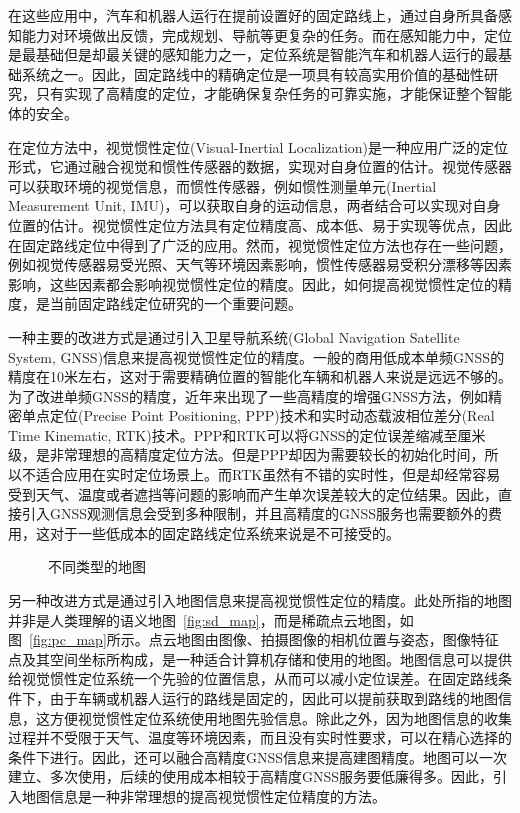 在这些应用中，汽车和机器人运行在提前设置好的固定路线上，通过自身所具备感知能力对环境做出反馈，完成规划、导航等更复杂的任务。而在感知能力中，定位是最基础但是却最关键的感知能力之一，定位系统是智能汽车和机器人运行的最基础系统之一。因此，固定路线中的精确定位是一项具有较高实用价值的基础性研究，只有实现了高精度的定位，才能确保复杂任务的可靠实施，才能保证整个智能体的安全。

在定位方法中，视觉惯性定位(Visual-Inertial Localization)是一种应用广泛的定位形式，它通过融合视觉和惯性传感器的数据，实现对自身位置的估计。视觉传感器可以获取环境的视觉信息，而惯性传感器，例如惯性测量单元(Inertial Measurement Unit, IMU)，可以获取自身的运动信息，两者结合可以实现对自身位置的估计。视觉惯性定位方法具有定位精度高、成本低、易于实现等优点，因此在固定路线定位中得到了广泛的应用。然而，视觉惯性定位方法也存在一些问题，例如视觉传感器易受光照、天气等环境因素影响，惯性传感器易受积分漂移等因素影响，这些因素都会影响视觉惯性定位的精度。因此，如何提高视觉惯性定位的精度，是当前固定路线定位研究的一个重要问题。

一种主要的改进方式是通过引入卫星导航系统(Global Navigation Satellite System, GNSS)信息来提高视觉惯性定位的精度。一般的商用低成本单频GNSS的精度在10米左右，这对于需要精确位置的智能化车辆和机器人来说是远远不够的。为了改进单频GNSS的精度，近年来出现了一些高精度的增强GNSS方法，例如精密单点定位(Precise Point Positioning, PPP)\cite{zumberge1997precise}技术和实时动态载波相位差分(Real Time Kinematic, RTK)\cite{fotopoulos2001overview}技术。PPP和RTK可以将GNSS的定位误差缩减至厘米级，是非常理想的高精度定位方法。但是PPP却因为需要较长的初始化时间\cite{bisnath2018innovation}，所以不适合应用在实时定位场景上。而RTK虽然有不错的实时性，但是却经常容易受到天气、温度或者遮挡等问题的影响而产生单次误差较大的定位结果\cite{li2022review}。因此，直接引入GNSS观测信息会受到多种限制，并且高精度的GNSS服务也需要额外的费用，这对于一些低成本的固定路线定位系统来说是不可接受的。

\begin{figure}
  \centering
  \caption{不同类型的地图}
  \label{fig:maps}
\end{figure}

另一种改进方式是通过引入地图信息来提高视觉惯性定位的精度。此处所指的地图并非是人类理解的语义地图~\ref{fig:sd_map}，而是稀疏点云地图，如图~\ref{fig:pc_map}所示。点云地图由图像、拍摄图像的相机位置与姿态，图像特征点及其空间坐标所构成，是一种适合计算机存储和使用的地图。地图信息可以提供给视觉惯性定位系统一个先验的位置信息，从而可以减小定位误差。在固定路线条件下，由于车辆或机器人运行的路线是固定的，因此可以提前获取到路线的地图信息，这方便视觉惯性定位系统使用地图先验信息。除此之外，因为地图信息的收集过程并不受限于天气、温度等环境因素，而且没有实时性要求，可以在精心选择的条件下进行。因此，还可以融合高精度GNSS信息来提高建图精度。地图可以一次建立、多次使用，后续的使用成本相较于高精度GNSS服务要低廉得多。因此，引入地图信息是一种非常理想的提高视觉惯性定位精度的方法。

